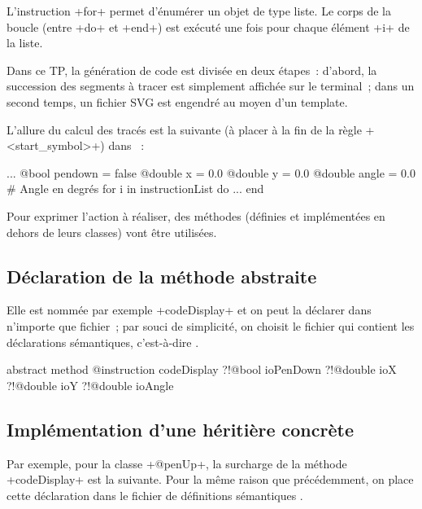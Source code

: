 L'instruction \ggs+for+ permet d’énumérer un objet de type liste. Le corps de la boucle (entre \ggs+do+ et \ggs+end+) est exécuté une fois pour chaque élément \ggs+i+ de la liste.









Dans ce TP, la génération de code est divisée en deux étapes~: d'abord, la succession des segments à tracer est simplement affichée sur le terminal~; dans un second temps, un fichier SVG est engendré au moyen d'un template.

L'allure du calcul des tracés est la suivante (à placer à la fin de la règle \ggs+<start_symbol>+) dans ~:

\begin{galgas}
  ...
  @bool pendown = false
  @double x = 0.0
  @double y = 0.0
  @double angle = 0.0 # Angle en degrés
  for i in instructionList do
    ...
  end
\end{galgas}

Pour exprimer l'action à réaliser, des méthodes (définies et implémentées en dehors de leurs classes) vont être utilisées.

\subsection{Déclaration de la méthode abstraite}
Elle est nommée par exemple \ggs+codeDisplay+ et on peut la déclarer dans n'importe que fichier~; par souci de simplicité, on choisit le fichier qui contient les déclarations sémantiques, c'est-à-dire .

\begin{galgas}
abstract method @instruction codeDisplay
  ?!@bool ioPenDown
  ?!@double ioX
  ?!@double ioY
  ?!@double ioAngle
\end{galgas}

\subsection{Implémentation d'une héritière concrète}

Par exemple, pour la classe \ggs+@penUp+, la surcharge de la méthode \ggs+codeDisplay+ est la suivante. Pour la même raison que précédemment, on place cette déclaration dans le fichier de définitions sémantiques .

